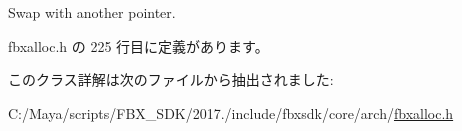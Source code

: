 Swap with another pointer. 



 fbxalloc.\+h の 225 行目に定義があります。



このクラス詳解は次のファイルから抽出されました\+:\begin{DoxyCompactItemize}
\item 
C\+:/\+Maya/scripts/\+F\+B\+X\+\_\+\+S\+D\+K/2017./include/fbxsdk/core/arch/\hyperlink{fbxalloc_8h}{fbxalloc.\+h}\end{DoxyCompactItemize}
